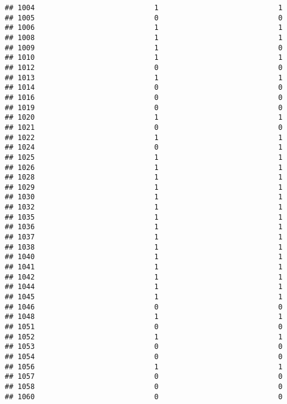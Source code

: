 \documentclass[
]{article}
\begin{document}
\begin{verbatim}
## 1004                            1                            1
## 1005                            0                            0
## 1006                            1                            1
## 1008                            1                            1
## 1009                            1                            0
## 1010                            1                            1
## 1012                            0                            0
## 1013                            1                            1
## 1014                            0                            0
## 1016                            0                            0
## 1019                            0                            0
## 1020                            1                            1
## 1021                            0                            0
## 1022                            1                            1
## 1024                            0                            1
## 1025                            1                            1
## 1026                            1                            1
## 1028                            1                            1
## 1029                            1                            1
## 1030                            1                            1
## 1032                            1                            1
## 1035                            1                            1
## 1036                            1                            1
## 1037                            1                            1
## 1038                            1                            1
## 1040                            1                            1
## 1041                            1                            1
## 1042                            1                            1
## 1044                            1                            1
## 1045                            1                            1
## 1046                            0                            0
## 1048                            1                            1
## 1051                            0                            0
## 1052                            1                            1
## 1053                            0                            0
## 1054                            0                            0
## 1056                            1                            1
## 1057                            0                            0
## 1058                            0                            0
## 1060                            0                            0

\end{verbatim}
\end{document}
